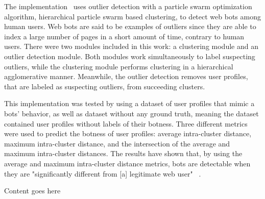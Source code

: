 The implementation~\cite{particle_swarm} uses outlier detection with a particle swarm optimization algorithm, hierarchical particle swarm based clustering, to detect web bots among human users.
Web bots are said to be examples of outliers since they are able to index a large number of pages in a short amount of time, contrary to human users.
There were two modules included in this work: a clustering module and an outlier detection module.
Both modules work simultaneously to label suspecting outliers, while the clustering module performs clustering in a hierarchical agglomerative manner.
Meanwhile, the outlier detection removes user profiles, that are labeled as suspecting outliers, from succeeding clusters.

This implementation was tested by using a dataset of user profiles that mimic a bots' behavior, as well as dataset without any ground truth, meaning the dataset contained user profiles without labels of their botness.
Three different metrics were used to predict the botness of user profiles: average intra-cluster distance, maximum intra-cluster distance, and the intersection of the average and maximum intra-cluster distances.
The results have shown that, by using the average and maximum intra-cluster distance metrics, bots are detectable when they are "significantly different from [a] legitimate web user" ~\cite{particle_swarm}.

Content goes here~\cite{optimized_outlier_bot_detection}
